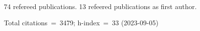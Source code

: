 74 refereed publications. 13 refeered publications as first author.

Total citations~=~3479; h-index~=~33 (2023-09-05)